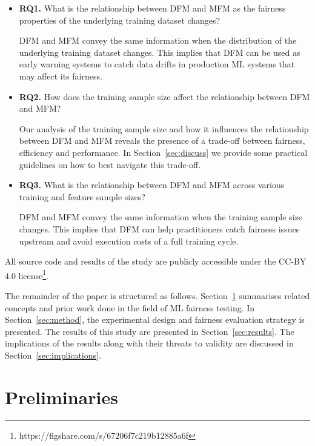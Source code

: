 \documentclass[sigconf,review,anonymous]{acmart}
\begin{document}

\begin{itemize}
  \item{\textbf{RQ1.}} What is the relationship between DFM and MFM as the
    fairness properties of the underlying training dataset changes?

    DFM and MFM convey the same information when the distribution of
    the underlying training dataset changes. This implies that DFM can
    be used as early warning systems to catch data drifts in
    production ML systems that may affect its fairness.

  \item{\textbf{RQ2.}} How does the training sample size affect the
    relationship between DFM and MFM?

    Our analysis of the training sample size and how it influences the
    relationship between DFM and MFM reveals the presence of
    a trade-off between fairness, efficiency and performance. In
    Section \ref{sec:discuss} we provide some practical guidelines on
    how to best navigate this trade-off.

  \item{\textbf{RQ3.}} What is the relationship between DFM and MFM across
    various training and feature sample sizes?

    DFM and MFM convey the same information when the training sample
    size changes. This implies that DFM can help practitioners catch
    fairness issues upstream and avoid execution costs of a full
    training cycle.
\end{itemize}

All source code and results of the study are publicly accessible under
the CC-BY 4.0
license\footnote{https://figshare.com/s/67206f7c219b12885a6f}.

The remainder of the paper is structured as follows.
Section \ref{sec:related} summarises related concepts and prior work
done in the field of ML fairness testing. In Section \ref{sec:method},
the experimental design and fairness evaluation strategy is presented.
The results of this study are presented in Section \ref{sec:results}.
The implications of the results along with their threats to validity
are discussed in Section \ref{sec:implications}.

\section{Preliminaries}\label{sec:related}
\end{document}
